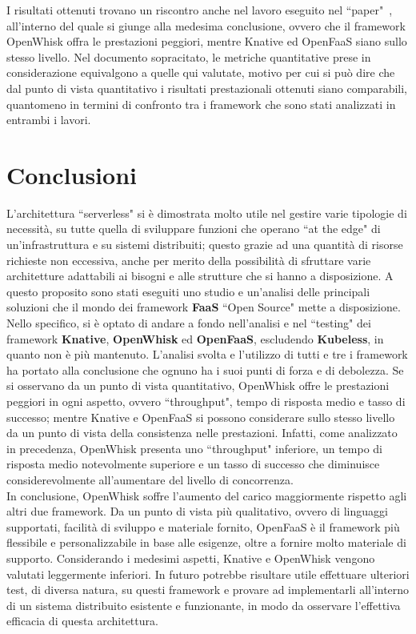 \documentclass[12pt,a4paper,openany,twoside]{book}
\begin{document}
\noindent
I risultati ottenuti trovano un riscontro anche nel lavoro eseguito nel ``paper"~\cite{Palade2019}, all'interno del quale si giunge alla medesima conclusione, ovvero che il framework OpenWhisk offra le prestazioni peggiori, mentre Knative ed OpenFaaS siano sullo stesso livello. Nel documento sopracitato, le metriche quantitative prese in considerazione equivalgono a quelle qui valutate, motivo per cui si può dire che dal punto di vista quantitativo i risultati prestazionali ottenuti siano comparabili, quantomeno in termini di confronto tra i framework che sono stati analizzati in entrambi i lavori.


\chapter{Conclusioni}
\label{chap:conclusioni}

L'architettura ``serverless" si è dimostrata molto utile nel gestire varie tipologie di necessità, su tutte quella di sviluppare funzioni che operano ``at the edge" di un'infrastruttura e su sistemi distribuiti; questo grazie ad una quantità di risorse richieste non eccessiva, anche per merito della possibilità di sfruttare varie architetture adattabili ai bisogni e alle strutture che si hanno a disposizione. A questo proposito sono stati eseguiti uno studio e un'analisi delle principali soluzioni che il mondo dei framework \textbf{\ac{FaaS}} ``Open Source" mette a disposizione.
Nello specifico, si è optato di andare a fondo nell'analisi e nel ``testing" dei framework \textbf{Knative}, \textbf{OpenWhisk} ed \textbf{OpenFaaS}, escludendo \textbf{Kubeless}, in quanto non è più mantenuto. L'analisi svolta e l'utilizzo di tutti e tre i framework ha portato alla conclusione che ognuno ha i suoi punti di forza e di debolezza. Se si osservano da un punto di vista quantitativo, OpenWhisk offre le prestazioni peggiori in ogni aspetto, ovvero ``throughput", tempo di risposta medio e tasso di successo; mentre Knative e OpenFaaS si possono considerare sullo stesso livello da un punto di vista della consistenza nelle prestazioni. Infatti, come analizzato in precedenza, OpenWhisk presenta uno ``throughput" inferiore, un tempo di risposta medio notevolmente superiore e un tasso di successo che diminuisce considerevolmente all'aumentare del livello di concorrenza.\\
In conclusione, OpenWhisk soffre l'aumento del carico maggiormente rispetto agli altri due framework. Da un punto di vista più qualitativo, ovvero di linguaggi supportati, facilità di sviluppo e materiale fornito, OpenFaaS è il framework più flessibile e personalizzabile in base alle esigenze, oltre a fornire molto materiale di supporto. Considerando i medesimi aspetti, Knative e OpenWhisk vengono valutati leggermente inferiori. In futuro potrebbe risultare utile effettuare ulteriori test, di diversa natura, su questi framework e provare ad implementarli all'interno di un sistema distribuito esistente e funzionante, in modo da osservare l'effettiva efficacia di questa architettura.
\end{document}
